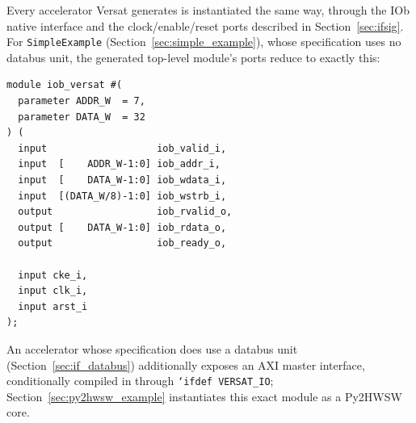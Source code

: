 %

Every accelerator Versat generates is instantiated the same way, through the IOb native interface and the clock/enable/reset ports described in Section~\ref{sec:ifsig}. For \texttt{SimpleExample} (Section~\ref{sec:simple_example}), whose specification uses no databus unit, the generated top-level module's ports reduce to exactly this:

\begin{lstlisting}
module iob_versat #(
  parameter ADDR_W  = 7,
  parameter DATA_W  = 32
) (
  input                   iob_valid_i,
  input  [    ADDR_W-1:0] iob_addr_i,
  input  [    DATA_W-1:0] iob_wdata_i,
  input  [(DATA_W/8)-1:0] iob_wstrb_i,
  output                  iob_rvalid_o,
  output [    DATA_W-1:0] iob_rdata_o,
  output                  iob_ready_o,

  input cke_i,
  input clk_i,
  input arst_i
);
\end{lstlisting}

An accelerator whose specification does use a databus unit (Section~\ref{sec:if_databus}) additionally exposes an AXI master interface, conditionally compiled in through \texttt{`ifdef VERSAT\_IO}; Section~\ref{sec:py2hwsw_example} instantiates this exact module as a Py2HWSW core.


